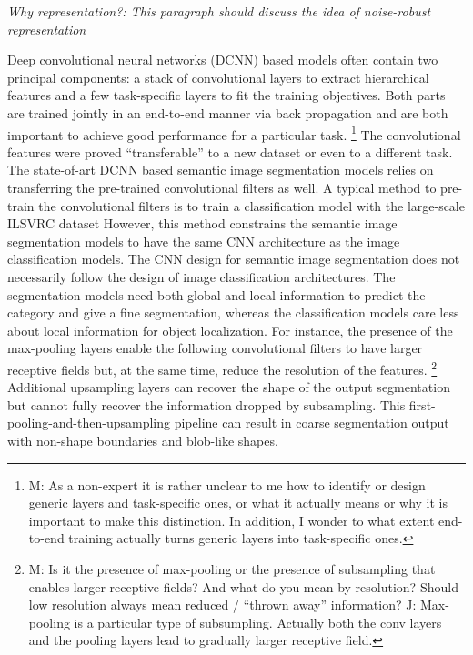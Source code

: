 \noindent
\textit{Why representation?: This paragraph should discuss the idea of noise-robust representation}

\noindent
Deep convolutional neural networks (DCNN) based models often contain two principal components: a stack of convolutional layers to extract hierarchical features and a few task-specific layers to fit the training objectives.
Both parts are trained jointly in an end-to-end manner via back propagation and are both important to achieve good performance for a particular task.
\footnote{M: As a non-expert it is rather unclear to me how to identify or design generic layers and task-specific ones, or what it actually means or why it is important to make this distinction.  In addition, I wonder to what extent end-to-end training actually turns generic layers into task-specific ones.} The convolutional features were proved ``transferable'' to a new dataset\cite{yosinski2014transferable} or even to a different task\cite{girshick2014rich}.
The state-of-art DCNN based semantic image segmentation models relies on transferring the pre-trained convolutional filters as well.\cite{long2015fully}
A typical method to pre-train the convolutional filters is to train a classification model with the large-scale ILSVRC dataset \cite{russakovsky2015imagenet}
However, this method constrains the semantic image segmentation models to have the same CNN architecture as the image classification models.
The CNN design for semantic image segmentation does not necessarily follow the design of image classification architectures.
The segmentation models need both global and local information to predict the category and give a fine segmentation, whereas the classification models care less about local information for object localization.
For instance, the presence of the max-pooling layers enable the following convolutional filters to have larger receptive fields but, at the same time, reduce the resolution of the features.
\footnote{M: Is it the presence of max-pooling or the presence of subsampling that enables larger receptive fields?  And what do you mean by resolution?  Should low resolution always mean reduced / ``thrown away'' information? J: Max-pooling is a particular type of subsumpling. Actually both the conv layers and the pooling layers lead to gradually larger receptive field.}
Additional upsampling layers can recover the shape of the output segmentation but cannot fully recover the information dropped by subsampling.
This first-pooling-and-then-upsampling pipeline can result in coarse segmentation output \cite{chen2016deeplab} with non-shape boundaries and blob-like shapes.
